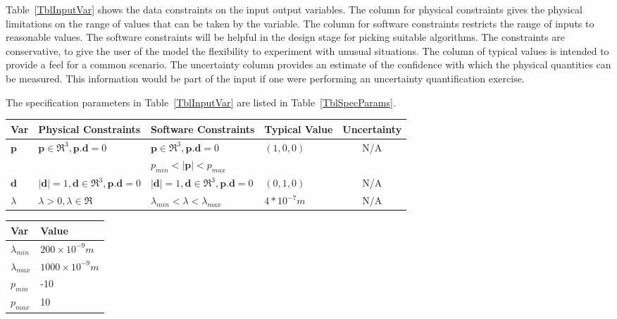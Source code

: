 \documentclass[12pt]{article}
\begin{document}
	Table~\ref{TblInputVar} shows the data constraints on the input output
	variables.  The column for physical constraints gives the physical limitations
	on the range of values that can be taken by the variable.  The column for
	software constraints restricts the range of inputs to reasonable values.  The
	software constraints will be helpful in the design stage for picking suitable
	algorithms.  The constraints are conservative, to give the user of the model the
	flexibility to experiment with unusual situations.  The column of typical values
	is intended to provide a feel for a common scenario.  The uncertainty column
	provides an estimate of the confidence with which the physical quantities can be
	measured.  This information would be part of the input if one were performing an
	uncertainty quantification exercise.
	
	The specification parameters in Table~\ref{TblInputVar} are listed in
	Table~\ref{TblSpecParams}.
	
	\begin{table}[!h] \caption{Input Variables} \label{TblInputVar} \renewcommand{\arraystretch}{1.2} \noindent \begin{longtable*}{l l l l c} \toprule \textbf{Var} & \textbf{Physical Constraints} & \textbf{Software Constraints} & \textbf{Typical Value} & Uncertainty\\ \midrule 
			$\textbf{p}$ & $\textbf{p} \in \Re^{3} , \textbf{p}.\textbf{d}=0$ & $ \textbf{p} \in \Re^{3}, \textbf{p}.\textbf{d}=0$ & $(1,0,0)$ & N/A \\
			 &   & $p_{min} < |\textbf{p}| < p_{max}$ & & \\
			$\textbf{d}$ & $|\textbf{d}|=1,  \textbf{d} \in \Re^{3}, \textbf{p}.\textbf{d}=0$ & $|\textbf{d}|=1, \textbf{d} \in \Re^{3}, \textbf{p}.\textbf{d}=0$ & $(0,1,0)$& N/A\\
			$\lambda$ & $\lambda>0,  \lambda \in \Re$ & $\lambda_{min} <\lambda< \lambda_{max}$ & $4 * 10^{-7} m$& N/A\\	
			 \bottomrule \end{longtable*} \end{table}

\begin{table}[!h] \caption{Specification Parameter Values} \label{TblSpecParams} \renewcommand{\arraystretch}{1.2} \noindent \begin{longtable*}{l l} \toprule \textbf{Var} & \textbf{Value} \\ \midrule  $\lambda_{min}$ & $200 \times 10^{-9} m$\\ $\lambda_{max}$ & $1000 \times 10^{-9} m$\\ $p_{min}$ & -10 \\ $p_{max}$ & 10 \\
		
		
		\bottomrule \end{longtable*} \end{table}
\end{document}
